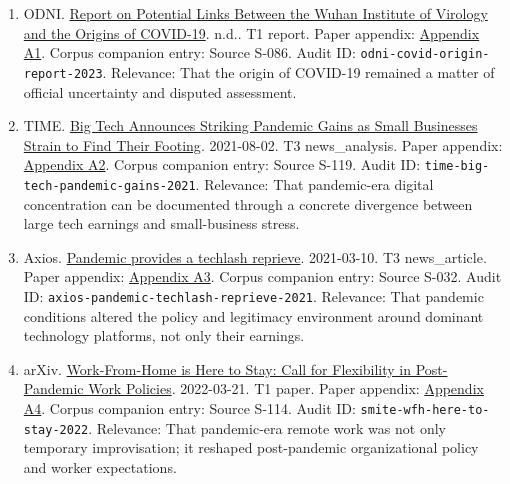 \documentclass[
  american,
  11pt,
  letterpaper,
]{article}
\providecommand{\tightlist}{%
  \setlength{\itemsep}{0pt}\setlength{\parskip}{0pt}}
\begin{document}
\begin{enumerate}
\def\labelenumi{\arabic{enumi}.}
\tightlist
\item
  ODNI.
  \href{https://www.dni.gov/files/ODNI/documents/assessments/Report-on-Potential-Links-Between-the-Wuhan-Institute-of-Virology-and-the-Origins-of-COVID-19-20230623.pdf}{Report
  on Potential Links Between the Wuhan Institute of Virology and the
  Origins of COVID-19}. n.d.. T1 report. Paper appendix:
  \hyperref[appendix-a1-report-on-potential-links-between-the-wuhan-institute-of-virology-and-the-origins-of-covid-19]{Appendix
  A1}. Corpus companion entry: Source S-086. Audit ID:
  \texttt{odni-covid-origin-report-2023}. Relevance: That the origin of
  COVID-19 remained a matter of official uncertainty and disputed
  assessment.
\item
  TIME.
  \href{https://time.com/6085674/big-tech-apple-microsoft-facebook-amazon-google-earnings/}{Big
  Tech Announces Striking Pandemic Gains as Small Businesses Strain to
  Find Their Footing}. 2021-08-02. T3 news\_analysis. Paper appendix:
  \hyperref[appendix-a2-big-tech-announces-striking-pandemic-gains-as-small-businesses-strain-to-find-their-footing]{Appendix
  A2}. Corpus companion entry: Source S-119. Audit ID:
  \texttt{time-big-tech-pandemic-gains-2021}. Relevance: That
  pandemic-era digital concentration can be documented through a
  concrete divergence between large tech earnings and small-business
  stress.
\item
  Axios.
  \href{https://www.axios.com/2021/03/10/pandemic-provides-techlash-reprieve}{Pandemic
  provides a techlash reprieve}. 2021-03-10. T3 news\_article. Paper
  appendix:
  \hyperref[appendix-a3-pandemic-provides-a-techlash-reprieve]{Appendix
  A3}. Corpus companion entry: Source S-032. Audit ID:
  \texttt{axios-pandemic-techlash-reprieve-2021}. Relevance: That
  pandemic conditions altered the policy and legitimacy environment
  around dominant technology platforms, not only their earnings.
\item
  arXiv. \href{https://arxiv.org/abs/2203.11136}{Work-From-Home is Here
  to Stay: Call for Flexibility in Post-Pandemic Work Policies}.
  2022-03-21. T1 paper. Paper appendix:
  \hyperref[appendix-a4-work-from-home-is-here-to-stay-call-for-flexibility-in-post-pandemic-work-policies]{Appendix
  A4}. Corpus companion entry: Source S-114. Audit ID:
  \texttt{smite-wfh-here-to-stay-2022}. Relevance: That pandemic-era
  remote work was not only temporary improvisation; it reshaped
  post-pandemic organizational policy and worker expectations.

\end{enumerate}
\end{document}
